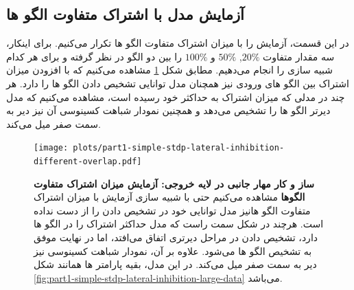     \subsection{آزمایش مدل با اشتراک متفاوت الگو ها}
        در این قسمت، آزمایش را با میزان اشتراک متفاوت الگو ها تکرار می‌کنیم. برای اینکار، سه مقدار متفاوت 
        $20\%$, $50\%$ و $100\%$
        را بین دو الگو در نظر گرفته و برای هر کدام شبیه سازی را انجام می‌دهیم. مطابق شکل 
        \ref{fig:part1-simple-stdp-lateral-inhibition-different-overlap}
        مشاهده می‌کنیم که با افزودن میزان اشتراک بین الگو های ورودی نیز همچنان مدل توانایی تشخیص دادن الگو ها را دارد. هر چند در مدلی که میزان اشتراک به حداکثر خود رسیده است، مشاهده می‌کنیم که مدل دیرتر الگو ها را تشخیص می‌دهد و همچنین نمودار شباهت کسینوسی آن نیز دیر به سمت صفر میل می‌کند.
        \begin{figure}[!ht]
            \centering
            \texttt{[image: plots/part1-simple-stdp-lateral-inhibition-different-overlap.pdf]} 
            \captionsetup{width=.85\linewidth}
            \caption{\textbf{ ساز و کار مهار جانبی در لایه خروجی: آزمایش میزان اشتراک متفاوت الگوها} 
            مشاهده می‌کنیم حتی با شبیه سازی آزمایش با میزان اشتراک متفاوت الگو هانیز مدل توانایی خود در تشخیص دادن را از دست نداده است. هرچند در شکل سمت راست که مدل حداکثر اشتراک را در الگو ها دارد، تشخیص دادن در مراحل دیرتری اتفاق می‌افتد، اما در نهایت موفق به تشخیص الگو ها می‌شود. علاوه بر آن، نمودار شباهت کسینوسی نیز دیر به سمت صفر میل می‌کند. در این مدل، بقیه پارامتر ها همانند شکل 
            \ref{fig:part1-simple-stdp-lateral-inhibition-large-data} 
            می‌باشد.
            }
            \label{fig:part1-simple-stdp-lateral-inhibition-different-overlap}
        \end{figure}

\clearpage
